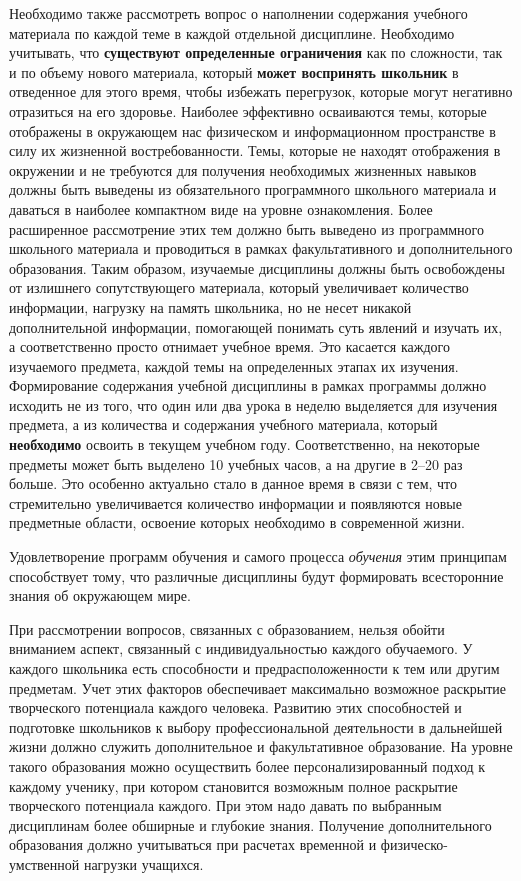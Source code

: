 \begin{textitemize}
	\item Необходимо также рассмотреть вопрос о наполнении содержания учебного материала по каждой теме в каждой отдельной дисциплине. Необходимо учитывать, что \textbf{существуют определенные ограничения} как по сложности, так и по объему нового материала, который \textbf{может воспринять школьник} в отведенное для этого время, чтобы избежать перегрузок, которые могут негативно отразиться на его здоровье. Наиболее эффективно осваиваются темы, которые отображены в окружающем нас физическом и информационном пространстве в силу их жизненной востребованности. Темы, которые не находят отображения в окружении и не требуются для получения необходимых жизненных навыков должны быть выведены из обязательного программного школьного материала и даваться в наиболее компактном виде на уровне ознакомления. Более расширенное рассмотрение этих тем должно быть выведено из программного школьного материала и проводиться в рамках факультативного и дополнительного образования. Таким образом, изучаемые дисциплины должны быть освобождены от излишнего сопутствующего материала, который увеличивает количество информации, нагрузку на память школьника, но не несет никакой дополнительной информации, помогающей понимать суть явлений и изучать их, а соответственно просто отнимает учебное время. Это касается каждого изучаемого предмета, каждой темы на определенных этапах их изучения. Формирование содержания учебной дисциплины в рамках программы должно исходить не из того, что один или два урока в неделю выделяется для изучения предмета, а из количества и содержания учебного материала, который \textbf{необходимо} освоить в текущем учебном году.  Соответственно, на некоторые предметы может быть выделено 10 учебных часов, а на другие в 2--20 раз больше. Это особенно актуально стало в данное время в связи с тем, что стремительно увеличивается количество информации и появляются новые предметные области, освоение которых необходимо в современной жизни.
\end{textitemize}

Удовлетворение программ обучения и самого процесса \textit{обучения} этим принципам способствует тому, что различные дисциплины будут формировать всесторонние знания об окружающем мире.

При рассмотрении вопросов, связанных с образованием, нельзя обойти вниманием аспект, связанный с индивидуальностью каждого обучаемого. У каждого школьника есть способности и предрасположенности к тем или другим предметам. Учет этих факторов обеспечивает максимально возможное раскрытие творческого потенциала каждого человека. Развитию этих способностей и подготовке школьников к выбору профессиональной деятельности в дальнейшей жизни должно служить дополнительное и факультативное образование. На уровне такого образования можно осуществить более персонализированный подход к каждому ученику, при котором становится возможным полное раскрытие творческого потенциала каждого. При этом надо давать по выбранным дисциплинам более обширные и глубокие знания. Получение дополнительного образования должно учитываться при расчетах временной и физическо-умственной нагрузки учащихся.

